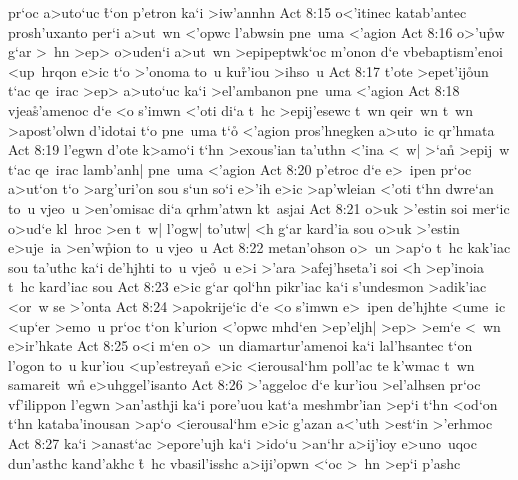 pr`oc
a>uto`uc
\r{t}`on
p'etron
ka`i
>iw'annhn\bibvsend
\vs Act 8:15
o<'itinec
katab'antec
prosh'uxanto
per`i
a>ut~wn
<'opwc
l'abwsin
pne~uma
<'agion\bibvsend
\vs Act 8:16
o>'u\r{p}w
g`ar
>~hn
>ep>
o>uden`i
a>ut~wn
>epipeptwk`oc
m'onon
d`e
vbebaptism'enoi
<up~hrqon
e>ic
t`o
>'onoma
to~u
ku\r{r}'iou
>ihso~u\bibvsend
\vs Act 8:17
t'ote
>epet'ij\r{o}un
t`ac
qe~irac
>ep>
a>uto`uc
ka`i
>el'ambanon
pne~uma
<'agion\bibvsend
\vs Act 8:18
vjea\r{s}'amenoc
d`e
<o
s'imwn
<'oti
di`a
t~hc
>epij'esewc
t~wn
qeir~wn
t~wn
>apost'olwn
d'idotai
t`o
pne~uma
t`o\r{}
<'agion
pros'hnegken
a>uto~ic
qr'hmata\bibvsend
\vs Act 8:19
l'egwn
d'ote
k>amo`i
t`hn
>exous'ian
ta'uthn
<'ina
<~w|
>`a\r{n}
>epij~w
t`ac
qe~irac
lamb'anh|
pne~uma
<'agion\bibvsend
\vs Act 8:20
p'etroc
d`e
e>~ipen
pr`oc
a>ut`on
t`o
>arg'uri'on
sou
s`un
so`i
e>'ih
e>ic
>ap'wleian
<'oti
t`hn
dwre`an
to~u
vjeo~u
>en'omisac
di`a
qrhm'atwn
kt~asjai\bibvsend
\vs Act 8:21
o>uk
>'estin
soi
mer`ic
o>ud`e
kl~hroc
>en
t~w|
l'ogw|
to'utw|
<h
g`ar
kard'ia
sou
o>uk
>'estin
e>uje~ia
>en'w\r{p}ion
to~u
vjeo~u\bibvsend
\vs Act 8:22
metan'ohson
o>~un
>ap`o
t~hc
kak'iac
sou
ta'uthc
ka`i
de'hjhti
to~u
vje\r{o}~u
e>i
>'ara
>afej'hseta'i
soi
<h
>ep'inoia
t~hc
kard'iac
sou\bibvsend
\vs Act 8:23
e>ic
g`ar
qol`hn
pikr'iac
ka`i
s'undesmon
>adik'iac
<or~w
se
>'onta\bibvsend
\vs Act 8:24
>apokrije`ic
d`e
<o
s'imwn
e>~ipen
de'hjhte
<ume~ic
<up`er
>emo~u
pr`oc
t`on
k'urion
<'opwc
mhd`en
>ep'eljh|
>ep>
>em`e
<~wn
e>ir'hkate\bibvsend
\vs Act 8:25
o<i
m`en
o>~un
diamartur'amenoi
ka`i
lal'hsantec
t`on
l'ogon
to~u
kur'iou
<up'estreyan\r{}
e>ic
<ierousal`hm
poll'ac
te
k'wmac
t~wn
samareit~wn\r{}
e>uhggel'isanto\bibvsend
\vs Act 8:26
>'aggeloc
d`e
kur'iou
>el'alhsen
pr`oc
vf'ilippon
l'egwn
>an'asthji
ka`i
pore'uou
kat`a
meshmbr'ian
>ep`i
t`hn
<od`on
t`hn
kataba'inousan
>ap`o
<ierousal`hm
e>ic
g'azan
a<'uth
>est`in
>'erhmoc\bibvsend
\vs Act 8:27
ka`i
>anast`ac
>epore'ujh
ka`i
>ido`u
>an`hr
a>ij'ioy
e>uno~uqoc
dun'asthc
kand'akhc
\r{t}~hc
vbasil'isshc
a>iji'opwn
<`oc
>~hn
>ep`i
p'ashc
